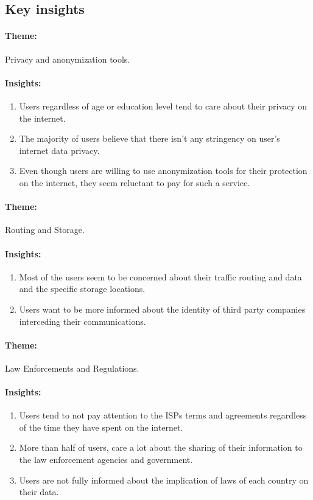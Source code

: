 \subsection{Key insights} 

\vspace{0.4cm}
\paragraph{Theme:} Privacy and anonymization tools.
\paragraph{Insights:}
\begin{enumerate}
\item
Users regardless of age or education level tend to care about their privacy on 
the internet.
\item
The majority of users believe that there isn't any stringency on user's internet 
data privacy.
\item
Even though users are willing to use anonymization tools for their protection on 
the internet, they seem reluctant to pay for such a service.
\end{enumerate}

\vspace{0.1cm}
\paragraph{Theme:} Routing and Storage. 
\paragraph{Insights:}
\begin{enumerate}
\item
Most of the users seem to be concerned about their traffic routing and data and 
the specific storage locations.
\item
Users want to be more informed about the identity of third party companies 
interceding their communications.
\end{enumerate}

\vspace{0.1cm}
\paragraph{Theme:} Law Enforcements and Regulations.
\paragraph{Insights:}
\begin{enumerate}
\item
Users tend to not pay attention to the ISPs terms and agreements regardless of 
the time they have spent on the internet. 
\item
More than half of users, care a lot about the sharing of their information to 
the law enforcement agencies and government.
\item
Users are not fully informed about the implication of laws of each country on 
their data.
\end{enumerate}


